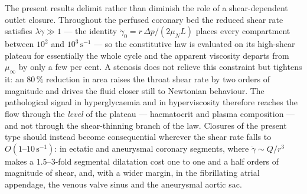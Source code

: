 %

The present results delimit rather than diminish the role of a shear-dependent
outlet closure. Throughout the perfused coronary bed the reduced shear rate
satisfies $\lambda\dot\gamma \gg 1$ --- the identity
$\dot\gamma_0 = r\,\Delta p/(2\mu_N L)$ places every compartment between
$10^2$ and $10^3\,\mathrm{s}^{-1}$ --- so the constitutive law is evaluated on
its high-shear plateau for essentially the whole cycle and the apparent
viscosity departs from $\mu_\infty$ by only a few per cent. A stenosis does not
relieve this constraint but tightens it: an $80\,\%$ reduction in area raises
the throat shear rate by two orders of magnitude and drives the fluid closer
still to Newtonian behaviour. The pathological signal in hyperglycaemia and in
hyperviscosity therefore reaches the flow through the \emph{level} of the
plateau --- haematocrit and plasma composition --- and not through the
shear-thinning branch of the law. Closures of the present type should instead
become consequential wherever the shear rate falls to
$O(1\text{--}10\,\mathrm{s}^{-1})$: in ectatic and aneurysmal coronary
segments, where $\dot\gamma \sim Q/r^3$ makes a $1.5$--$3$-fold segmental
dilatation cost one to one and a half orders of magnitude of shear, and, with
a wider margin, in the fibrillating atrial appendage, the venous valve sinus
and the aneurysmal aortic sac.

